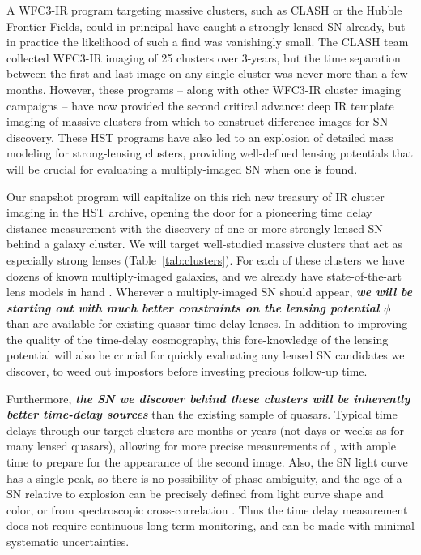 A WFC3-IR program targeting massive clusters, such as CLASH or the
Hubble Frontier Fields, could in principal have caught a strongly
lensed SN already, but in practice the likelihood of such a find was
vanishingly small.  The CLASH team collected WFC3-IR imaging of 25
clusters over 3-years, but the time separation between the first and
last image on any single cluster was never more than a few months.
However, these programs -- along with other WFC3-IR cluster imaging
campaigns -- have now provided the second critical advance: deep IR
template imaging of massive clusters from which to construct
difference images for SN discovery.  These HST programs have also led
to an explosion of detailed mass modeling for strong-lensing clusters,
providing well-defined lensing potentials that will be crucial for
evaluating a multiply-imaged SN when one is found.  

Our snapshot program will capitalize on this rich new treasury of IR
cluster imaging in the HST archive, opening the door for a pioneering
time delay distance measurement with the discovery of one or more
strongly lensed SN behind a galaxy cluster.  We will target
well-studied massive clusters that act as especially strong lenses
(Table~\ref{tab:clusters}). For each of these clusters we have dozens
of known multiply-imaged galaxies, and we already have
state-of-the-art lens models in
hand \citep[e.g.][]{Zitrin:2011a,Zitrin:2011b,Zitrin:2012a,Zitrin:2012b,Zitrin:2013}.
Wherever a multiply-imaged SN should appear, {\bf \em we will be
starting out with much better constraints on the lensing potential
$\phi$} than are available for existing quasar time-delay lenses. In
addition to improving the quality of the time-delay cosmography, this
fore-knowledge of the lensing potential will also be crucial for
quickly evaluating any lensed SN candidates we discover, to weed out
impostors before investing precious follow-up time.

Furthermore, {\bf \em the SN we discover behind these clusters will be
inherently better time-delay sources} than the existing sample of
quasars.  Typical time delays through our target clusters are months
or years (not days or weeks as for many lensed quasars), allowing for
more precise measurements of \dt, with ample time to prepare for the
appearance of the second image.  Also, the SN light curve has a single
peak, so there is no possibility of phase ambiguity, and the age of a
SN relative to explosion can be precisely defined from light curve
shape and color, or from spectroscopic
cross-correlation \citep{Filippenko:1997,Blondin:2007}.  Thus the time
delay measurement does not require continuous long-term monitoring,
and can be made with minimal systematic uncertainties.

